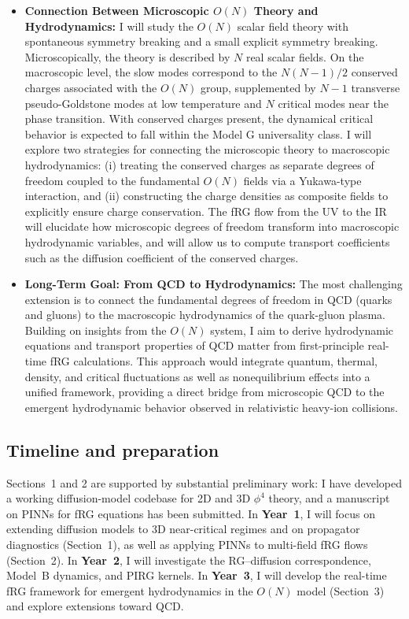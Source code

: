\documentclass[11pt,a4paper]{article}
\begin{document}
\begin{itemize}
    \item \textbf{Connection Between Microscopic $O(N)$ Theory and Hydrodynamics:}
    I will study the $O(N)$ scalar field theory with spontaneous symmetry breaking and a small explicit symmetry breaking. Microscopically, the theory is described by $N$ real scalar fields. On the macroscopic level, the slow modes correspond to the $N(N-1)/2$ conserved charges associated with the $O(N)$ group, supplemented by $N-1$ transverse pseudo-Goldstone modes at low temperature and $N$ critical modes near the phase transition. With conserved charges present, the dynamical critical behavior is expected to fall within the Model G universality class\cite{Hohenberg:1977ym}. I will explore two strategies for connecting the microscopic theory to macroscopic hydrodynamics: (i) treating the conserved charges as separate degrees of freedom coupled to the fundamental $O(N)$ fields via a Yukawa-type interaction\cite{Fu:2019hdw}, and (ii) constructing the charge densities as composite fields to explicitly ensure charge conservation. The fRG flow from the UV to the IR will elucidate how microscopic degrees of freedom transform into macroscopic hydrodynamic variables, and will allow us to compute transport coefficients such as the diffusion coefficient of the conserved charges.

    \item \textbf{Long-Term Goal: From QCD to Hydrodynamics:}
    The most challenging extension is to connect the fundamental degrees of freedom in QCD (quarks and gluons) to the macroscopic hydrodynamics of the quark-gluon plasma. Building on insights from the $O(N)$ system, I aim to derive hydrodynamic equations and transport properties of QCD matter from first-principle real-time fRG calculations. This approach would integrate quantum, thermal, density, and critical fluctuations as well as nonequilibrium effects into a unified framework, providing a direct bridge from microscopic QCD to the emergent hydrodynamic behavior observed in relativistic heavy-ion collisions.
\end{itemize}

\subsection*{Timeline and preparation}
Sections~1 and 2 are supported by substantial preliminary work: I have developed a working diffusion-model codebase for 2D and 3D $\phi^4$ theory, and a manuscript on PINNs for fRG equations has been submitted\cite{Tan:2026bqn}. In \textbf{Year~1}, I will focus on extending diffusion models to 3D near-critical regimes and on propagator diagnostics (Section~1), as well as applying PINNs to multi-field fRG flows (Section~2). In \textbf{Year~2}, I will investigate the RG--diffusion correspondence, Model~B dynamics, and PIRG kernels. In \textbf{Year~3}, I will develop the real-time fRG framework for emergent hydrodynamics in the $O(N)$ model (Section~3) and explore extensions toward QCD.
\end{document}
